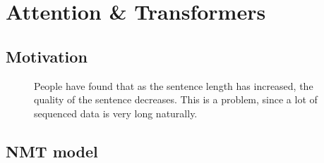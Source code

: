 \documentclass[11pt]{article}
\begin{document}
\section{Attention \& Transformers}

\subsection{Motivation}

\begin{figure}[H]
    \centering
    \caption*{
        People have found that as the sentence length has increased, the quality of the sentence decreases. This is a problem, since a lot of sequenced data is very long naturally.
    }
\end{figure}

\subsection{NMT model}
\end{document}
